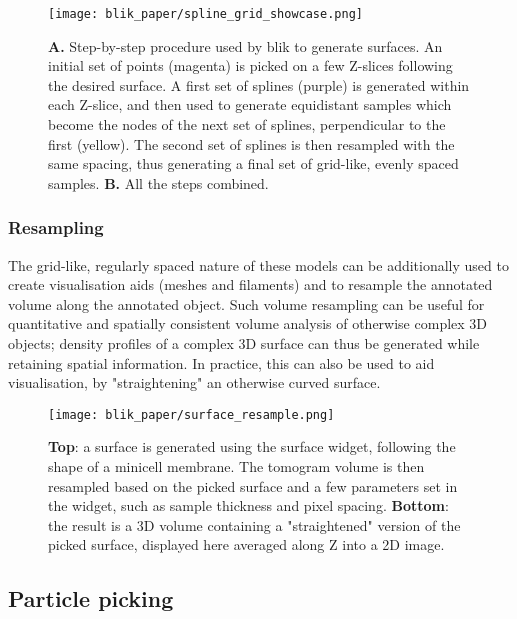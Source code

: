 \begin{figure}[!ht]
    \centering
    \texttt{[image: blik\_paper/spline\_grid\_showcase.png]}
    \caption[Surface generation procedure]{\textbf{A.} Step-by-step procedure used by blik to generate surfaces. An initial set of points (magenta) is picked on a few Z-slices following the desired surface. A first set of splines (purple) is generated within each Z-slice, and then used to generate equidistant samples which become the nodes of the next set of splines, perpendicular to the first (yellow). The second set of splines is then resampled with the same spacing, thus generating a final set of grid-like, evenly spaced samples. \textbf{B.} All the steps combined.}
    \label{surface-pick}
\end{figure}

\subsubsection{Resampling}\label{resampling}
The grid-like, regularly spaced nature of these models can be additionally used to create visualisation aids (meshes and filaments) and to resample the annotated volume along the annotated object. Such volume resampling can be useful for quantitative and spatially consistent volume analysis of otherwise complex 3D objects; density profiles of a complex 3D surface can thus be generated while retaining spatial information. In practice, this can also be used to aid visualisation, by "straightening" an otherwise curved surface.

\begin{figure}[!ht]
    \centering
    \texttt{[image: blik\_paper/surface\_resample.png]}
    \caption[Surface-based volume resampling]{\textbf{Top}: a surface is generated using the surface widget, following the shape of a minicell membrane. The tomogram volume is then resampled based on the picked surface and a few parameters set in the widget, such as sample thickness and pixel spacing. \textbf{Bottom}: the result is a 3D volume containing a "straightened" version of the picked surface, displayed here averaged along Z into a 2D image.}
    \label{surface-resample}
\end{figure}

\subsection{Particle picking}\label{particle-picking}


